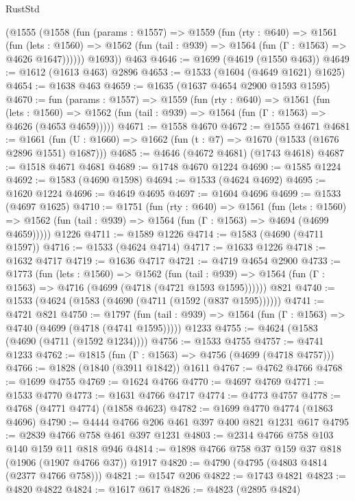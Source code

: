 \begin{lexlean}{RustStd}
\begin{coremodule}
      (@1555
        (@1558
          (fun (params : @1557) =>
          @1559
            (fun (rty : @640) =>
            @1561
              (fun (lets : @1560) =>
              @1562 (fun (tail : @939) => @1564 (fun (Γ : @1563) => @4626 @1647))))))
        @1693))
    @463
@4646 := @1699 (@4619 (@1550 @463))
@4649 := @1612 (@1613 @463) @2896
@4653 := @1533 (@1604 (@4649 @1621) @1625)
@4654 := @1638 @463
@4659 := @1635 (@1637 @4654 @2900 @1593 @1595)
@4670 := fun (params : @1557) =>
  @1559
    (fun (rty : @640) =>
    @1561
      (fun (lets : @1560) =>
      @1562 (fun (tail : @939) => @1564 (fun (Γ : @1563) => @4626 (@4653 @4659)))))
@4671 := @1558 @4670
@4672 := @1555 @4671
@4681 := @1661 (fun (U : @1660) => @1662 (fun (t : @7) => @1670 (@1533 (@1676 @2896 @1551) @1687)))
@4685 := @4646 (@4672 @4681) (@1743 @4618)
@4687 := @1518 @4671 @4681
@4689 := @1748 @4670 @1224
@4690 := @1585 @1224
@4692 := @1583 (@4690 @1598)
@4694 := @1533 (@4624 @4692)
@4695 := @1620 @1224
@4696 := @4649 @4695
@4697 := @1604 @4696
@4699 := @1533 (@4697 @1625)
@4710 := @1751
    (fun (rty : @640) =>
    @1561
      (fun (lets : @1560) =>
      @1562 (fun (tail : @939) => @1564 (fun (Γ : @1563) => @4694 (@4699 @4659)))))
    @1226
@4711 := @1589 @1226
@4714 := @1583 (@4690 (@4711 @1597))
@4716 := @1533 (@4624 @4714)
@4717 := @1633 @1226
@4718 := @1632 @4717
@4719 := @1636 @4717
@4721 := @4719 @4654 @2900
@4733 := @1773
    (fun (lets : @1560) =>
    @1562
      (fun (tail : @939) => @1564 (fun (Γ : @1563) => @4716 (@4699 (@4718 (@4721 @1593 @1595))))))
    @821
@4740 := @1533 (@4624 (@1583 (@4690 (@4711 (@1592 (@837 @1595))))))
@4741 := @4721 @821
@4750 := @1797
    (fun (tail : @939) => @1564 (fun (Γ : @1563) => @4740 (@4699 (@4718 (@4741 @1595)))))
    @1233
@4755 := @4624 (@1583 (@4690 (@4711 (@1592 @1234))))
@4756 := @1533 @4755
@4757 := @4741 @1233
@4762 := @1815 (fun (Γ : @1563) => @4756 (@4699 (@4718 @4757)))
@4766 := @1828 (@1840 (@3911 @1842)) @1611
@4767 := @4762 @4766
@4768 := @1699 @4755
@4769 := @1624 @4766
@4770 := @4697 @4769
@4771 := @1533 @4770
@4773 := @1631 @4766 @4717
@4774 := @4773 @4757
@4778 := @4768 (@4771 @4774) (@1858 @4623)
@4782 := @1699 @4770 @4774 (@1863 @4696)
@4790 := @4444 @4766 @206 @461 @397 @400 @821 @1231 @617
@4795 := @2839 @4766 @758 @461 @397 @1231
@4803 := @2314 @4766 @758 @103 @140 @159 @11 @818 @946
@4814 := @1898 @4766 @758 @37 @159 @37 @818 (@1906 (@1907 @4766 @37)) @1917
@4820 := @4790 (@4795 (@4803 @4814 (@2377 @4766 @758)))
@4821 := @1547 @206
@4822 := @1743 @4821
@4823 := @4820 @4822
@4824 := @1617 @617
@4826 := @4823 (@2895 @4824)

\end{coremodule}
\end{lexlean}
